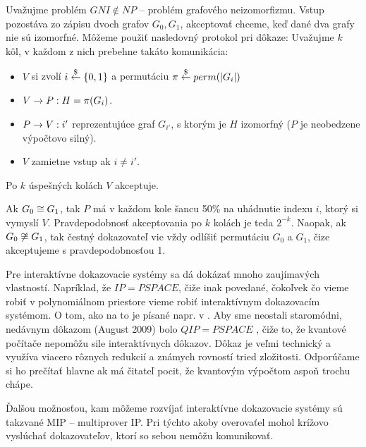 \begin{priklad}
    Uvažujme problém $GNI \not \in NP$ -- problém grafového neizomorfizmu.
    Vstup pozostáva zo zápisu dvoch grafov $G_0, G_1$, akceptovať chceme, keď
    dané dva grafy nie sú izomorfné. Môžeme použiť nasledovný protokol
    pri dôkaze: Uvažujme $k$ kôl, v každom z nich prebehne takáto
    komunikácia:
    \begin{itemize}
        \item $V$ si zvolí $i \overset{\$}{\leftarrow} \{0,1\}$ a permutáciu
         $\pi \overset{\$}{\leftarrow} perm(|G_i|)$
        \item $V \rightarrow P: H = \pi(G_i)$.
        \item $P \rightarrow V: i'$ reprezentujúce graf $G_{i'}$, s ktorým je $H$
        izomorfný ($P$ je neobedzene výpočtovo silný).
        \item $V$ zamietne vstup ak $i \not = i'$.
    \end{itemize}
    Po $k$ úspešných kolách $V$ akceptuje.

    Ak $G_0 \cong G_1$, tak $P$ má v každom kole šancu 50\% na
    uhádnutie indexu $i$, ktorý si vymyslí $V$. 
    Pravdepodobnosť akceptovania po $k$ kolách je teda $2^{-k}$.
    Naopak, ak $G_0 \not \cong G_1$, tak čestný dokazovateľ vie
    vždy odlíšiť permutáciu $G_0$ a $G_1$,
    čize akceptujeme s pravdepodobnosťou 1.
\end{priklad}

Pre interaktívne dokazovacie systémy sa dá dokázať mnoho zaujímavých
vlastností. Napríklad, že $IP=PSPACE$,
čiže inak povedané, čokoľvek čo
vieme robiť v polynomiálnom priestore vieme robiť interaktívnym
dokazovacím systémom. O tom, ako na to je písané napr. v
\cite{ip-pspace}. Aby sme neostali staromódni, nedávnym dôkazom
(August 2009) bolo $QIP=PSPACE$ \cite{qip-pspace}, čiže to,
že kvantové počítače nepomôžu sile interaktívnych dôkazov.
Dôkaz je veľmi technický a využíva viacero rôznych redukcií a známych
rovností tried zložitosti. Odporúčame si ho prečítať hlavne ak má
čitateľ pocit, že kvantovým výpočtom aspoň trochu chápe.

Ďalšou možnosťou, kam môžeme rozvíjať interaktívne dokazovacie systémy
sú takzvané MIP -- multiprover IP. Pri týchto akoby overovaťel mohol
krížovo vyslúchať dokazovateľov, ktorí so sebou nemôžu komunikovať.
